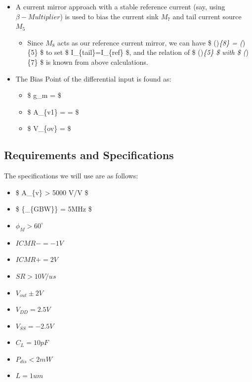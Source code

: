 \documentclass[
]{article}
\providecommand{\tightlist}{%
  \setlength{\itemsep}{0pt}\setlength{\parskip}{0pt}}
\begin{document}
\begin{itemize}
\item
  A current mirror approach with a stable reference current (say, using
  \(\beta-Multiplier\)) is used to bias the current sink \(M_{7}\) and
  tail current source \(M_{5}\)

  \begin{itemize}
  \tightlist
  \item
    Since \(M_{8}\) acts as our reference current mirror, we can have \$
    ()\emph{\{8\} = (})\{5\} \$ to set \$
    I\_\{tail\}=I\_\{ref\} \$, and the relation of \$
    ()\emph{\{5\} \$ with \$ (})\{7\} \$ is known
    from above calculations.
  \end{itemize}
\item
  The Bias Point of the differential input is found as:

  \begin{itemize}
  \tightlist
  \item
    \$ g\_m =  \$
  \item
    \$ \textbar A\_\{v1\}\textbar{} =  =
     \$
  \item
    \$ V\_\{ov\} =  \$
  \end{itemize}
\end{itemize}

\subsection{Requirements and
Specifications}\label{requirements-and-specifications}

The specifications we will use are as follows:

\begin{itemize}
\tightlist
\item
  \$ A\_\{v\} \textgreater{} 5000 V/V \$
\item
  \$ \{\omega\_\{GBW\}\} = 5MHz \$
\item
  \(\phi_{M} > 60^{\circ}\)
\item
  \(ICMR- = -1V\)
\item
  \(ICMR+ = 2V\)
\item
  \(SR > 10V/us\)
\item
  \(V_{out} \pm2V\)
\item
  \(V_{DD} = 2.5V\)
\item
  \(V_{SS} = -2.5V\)
\item
  \(C_{L} = 10pF\)
\item
  \(P_{dis} < 2mW\)
\item
  \(L = 1um\)
\end{itemize}
\end{document}
